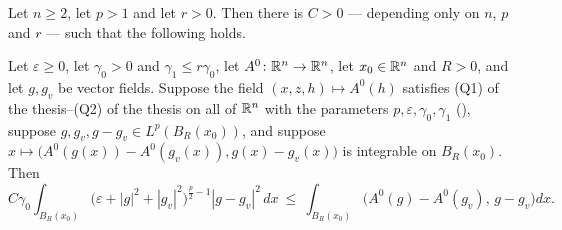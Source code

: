 \begin{lemma}
Let $n\ge2$, let $p>1$ and let $r>0$.  Then there is $C>0$ --- depending only on
$n$, $p$ and $r$ --- such that the following holds.

Let $\varepsilon\ge0$, let $\gamma_0>0$ and $\gamma_1\le r\gamma_0$, let
$A^0\colon\mathbb{R}^n\to\mathbb{R}^n$, let $x_0\in\mathbb{R}^n$ and $R>0$, and let $g,g_v$ be vector
fields.  Suppose the field $(x,z,h)\mapsto A^0(h)$ satisfies
(Q1) of the thesis--(Q2) of the thesis on all of $\mathbb{R}^n$ with the parameters
$p,\varepsilon,\gamma_0,\gamma_1$ (), suppose
$g,g_v,g-g_v\in L^p(B_R(x_0))$, and suppose
$x\mapsto\bigl(A^0(g(x))-A^0(g_v(x)),g(x)-g_v(x)\bigr)$ is integrable on
$B_R(x_0)$.  Then
\[
C\gamma_0\int_{B_R(x_0)}
\bigl(\varepsilon+|g|^2+|g_v|^2\bigr)^{\frac p2-1}|g-g_v|^2\,dx
\ \le\ \int_{B_R(x_0)}\bigl(A^0(g)-A^0(g_v),\,g-g_v\bigr)dx .
\]
\end{lemma}
